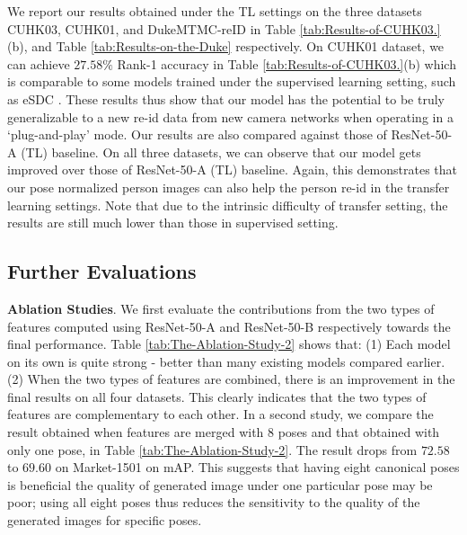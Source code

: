 \documentclass[10pt,letterpaper,twocolumn,10pt,letterpaper,twocolumn]{article}
\begin{document}
We report our results obtained under the TL settings on the three
datasets \textendash{} CUHK03, CUHK01, and DukeMTMC-reID in Table
\ref{tab:Results-of-CUHK03.}(b), and Table \ref{tab:Results-on-the-Duke}
respectively. On\textbf{ }CUHK01 dataset, we can achieve $27.58\%$
Rank-1 accuracy in Table \ref{tab:Results-of-CUHK03.}(b) which is
comparable to some models trained under the supervised learning setting,
such as eSDC {\cite{unsupervised_per_reid}}. These results
thus show that our model has the potential to be truly generalizable
to a new re-id data from new camera networks \textendash{} when operating
in a `plug-and-play' mode. Our results are also compared against those
of ResNet-50-A (TL) baseline. On all three datasets, we can observe that
our model gets improved over those of ResNet-50-A (TL) baseline. Again,
this demonstrates that our pose normalized person images can also
help the person re-id in the transfer learning settings. Note that
due to the intrinsic difficulty of transfer setting, the results are
still much lower than those in supervised setting. 

\subsection{Further Evaluations}

\noindent \textbf{Ablation Studies}. We first evaluate the contributions
from the two types of features computed using ResNet-50-A and ResNet-50-B
respectively towards the final performance. Table \ref{tab:The-Ablation-Study-2}
shows that: (1) Each model on its own is quite strong - better than
many existing models compared earlier.  (2) When the two types of features
are combined, there is an improvement in the final results on all four
datasets. This clearly indicates that the two types of features are
complementary to each other. In a second study, we compare the result
obtained when features are merged with 8 poses and that obtained with
only one pose, in Table \ref{tab:The-Ablation-Study-2}. The result
drops from $72.58$ to $69.60$ on Market-1501 on mAP. This suggests
that having eight canonical poses is beneficial \textendash{} the
quality of generated image under one particular pose may be poor;
using all eight poses thus reduces the sensitivity to the quality
of the generated images for specific poses.
\end{document}
